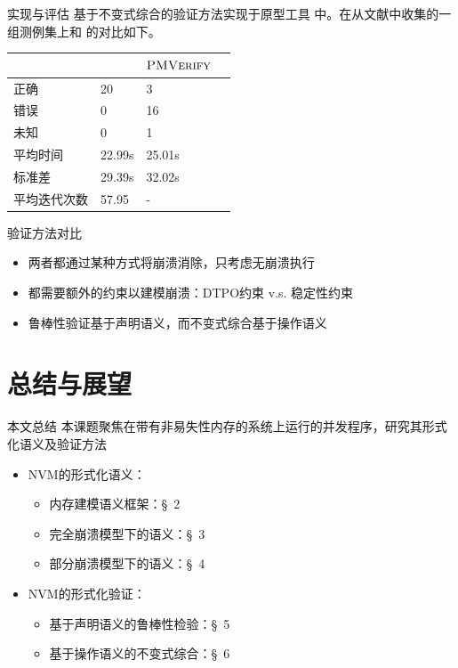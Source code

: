 \documentclass{beamer}
\begin{document}
\begin{frame}{实现与评估}
	基于不变式综合的验证方法实现于原型工具 \pinvince{} 中。在从文献中收集的一组测例集上和 \pmverify{} 的对比如下。

    \vfill
	\centering

	\begin{tabular}{llll}
		\toprule
		       & \pinvince{} & $\textsc{PMVerify}$ \\
		\midrule
		正确     & 20          & 3               \\
		错误     & 0           & 16              \\
		未知     & 0           & 1               \\
		平均时间   & 22.99s      & 25.01s          \\
		标准差    & 29.39s      & 32.02s          \\
		平均迭代次数 & 57.95       & -               \\
		\bottomrule
	\end{tabular}
\end{frame}

\begin{frame}{验证方法对比}
    \begin{itemize}[<+->]
        \item 两者都通过某种方式将崩溃消除，只考虑无崩溃执行
        \item 都需要额外的约束以建模崩溃：DTPO约束 v.s. 稳定性约束
        \item 鲁棒性验证基于声明语义，而不变式综合基于操作语义
    \end{itemize}
\end{frame}

\section{总结与展望}

\begin{frame}{本文总结}
    本课题聚焦在带有非易失性内存的系统上运行的并发程序，研究其形式化语义及验证方法
    \begin{itemize}
        \item NVM的形式化语义：
        \begin{itemize}
            \item 内存建模语义框架：\S~2
            \item 完全崩溃模型下的语义：\S~3
            \item 部分崩溃模型下的语义：\S~4
        \end{itemize}
        \item NVM的形式化验证：
        \begin{itemize}
            \item 基于声明语义的鲁棒性检验：\S~5
            \item 基于操作语义的不变式综合：\S~6        
        \end{itemize}
    \end{itemize}
\end{frame}
\end{document}
